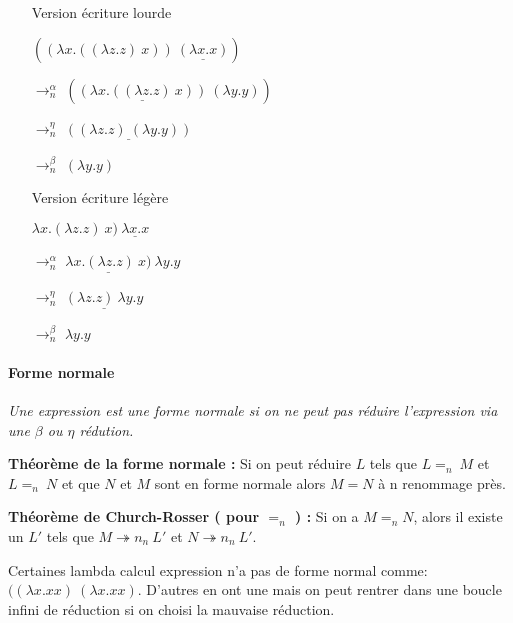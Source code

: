\documentclass[10pt,a4paper]{article}
\begin{document}
				\begin{multicols}{2}{
					\begin{itemize}
						\item[] Version écriture lourde
						\item[] $((\lambda x.((\lambda z.z)~x))~\underline{(\lambda x.x)})$
						\item[$\rightarrow_{n}^{\alpha}$] $(\underline{(\lambda x.((\lambda z.z)~x))}~(\lambda y.y))$
						\item[$\rightarrow_{n}^{\eta}$] $\underline{((\lambda z.z)~(\lambda y.y))}$
						\item[$\rightarrow_{n}^{\beta}$] $(\lambda y.y)$
					\end{itemize}
				
					\begin{itemize}
						\item[] Version écriture légère
						\item[] $\lambda x.(\lambda z.z)~x)~\underline{\lambda x.x}$
						\item[$\rightarrow_{n}^{\alpha}$] $\underline{\lambda x.(\lambda z.z)~x)}~\lambda y.y$
						\item[$\rightarrow_{n}^{\eta}$] $\underline{(\lambda z.z)~\lambda y.y}$
						\item[$\rightarrow_{n}^{\beta}$] $\lambda y.y$
					\end{itemize}
				}
				\end{multicols}
				\bigbreak
				
				
			\paragraph{Forme normale}
			
			\textit{Une expression est une forme normale si on ne peut pas réduire l'expression via une $\beta$ ou $\eta$ rédution.}
			\medbreak
			
			\textbf{Théorème de la forme normale :}
			Si on peut réduire $L$ tels que $L =_{n}~M$ et $L =_{n}~N$ et que $N$ et $M$ sont en forme normale alors $M = N$ à n renommage près.
			\medbreak	
			
			\textbf{Théorème de Church-Rosser ( pour $=_{n}$ ) :}
			Si on a $M =_{n} N$, alors il existe un $L'$ tels que $M \twoheadrightarrow n_{n}~L'$ et $N \twoheadrightarrow n_{n}~L'$.
			\medbreak
			
			Certaines lambda calcul expression n'a pas de forme normal comme: $((\lambda x.x x)~(\lambda x.x x)$. 
			D'autres en ont une mais on peut rentrer dans une boucle infini de réduction si on choisi la mauvaise réduction.
			\medbreak
			
\end{document}
